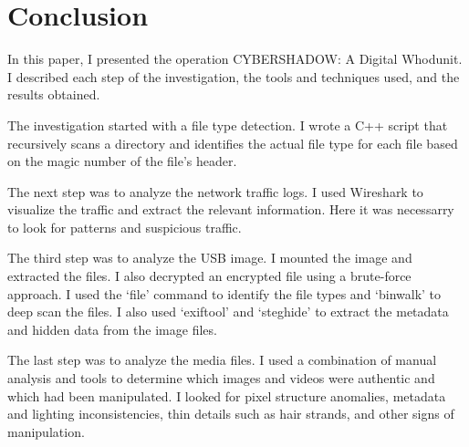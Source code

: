 \documentclass[pdflatex,sn-mathphys-num]{sn-jnl}
\begin{document}
\section{Conclusion}

\par In this paper, I presented the operation CYBERSHADOW\@: A Digital Whodunit. I described each step of the
investigation, the tools and techniques used, and the results obtained.

\par The investigation started with a file type detection. I wrote a C++ script that recursively scans a directory
and identifies the actual file type for each file based on the magic number of the file's header.

\par The next step was to analyze the network traffic logs. I used Wireshark to visualize the traffic and extract the
relevant information. Here it was necessarry to look for patterns and suspicious traffic.

\par The third step was to analyze the USB image. I mounted the image and extracted the files. I also decrypted an
encrypted file using a brute-force approach. I used the `file' command to identify the file types and `binwalk' to
deep scan the files. I also used `exiftool' and `steghide' to extract the metadata and hidden data from the image files.

\par The last step was to analyze the media files. I used a combination of manual analysis and tools to determine
which images and videos were authentic and which had been manipulated. I looked for pixel structure anomalies, metadata
and lighting inconsistencies, thin details such as hair strands, and other signs of manipulation.

%

\end{document}
